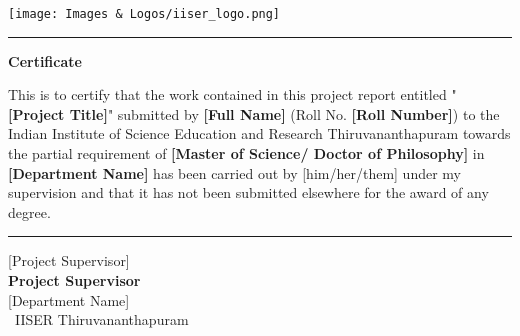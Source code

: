 
\thispagestyle{plain}


 \flushleft
 \texttt{[image: Images \& Logos/iiser\_logo.png]}

\vspace{0.5\baselineskip}
\hrule
\vspace{3\baselineskip}

\begin{center}
{\Large {\bf Certificate}}
\end{center}

\vspace{\baselineskip}

\noindent This is to certify that the work contained in this project report entitled
"\textbf{[Project Title]}" submitted by \textbf{[Full Name]} (Roll No. \textbf{[Roll Number]}) to the Indian Institute of Science Education and Research Thiruvananthapuram towards the partial requirement of {\bf [Master of Science/ Doctor of Philosophy]} in \textbf{[Department Name]} has been carried out by {[him/her/them]} under my supervision and that it has not been submitted elsewhere for the award of any degree.

\vspace{3\baselineskip}
\begin{flushright}
\begin{minipage}[c]{0.45\textwidth}
\centering
\vspace{3\baselineskip}
\hrule
\vspace{1.5\baselineskip}
{\large [Project Supervisor]} \bigskip\\
{\large \bf Project Supervisor} \\
\large [Department Name] ~\\\
IISER Thiruvananthapuram
\end{minipage}
\end{flushright}
\vspace{\baselineskip}
\restoregeometry

